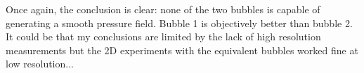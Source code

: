 

Once again, the conclusion is clear: none of the two bubbles is capable of generating a 
smooth pressure field. Bubble 1 is objectively better than bubble 2.
It could be that my conclusions are limited by the lack of high resolution measurements
but the 2D experiments with the equivalent bubbles worked fine at low resolution...
